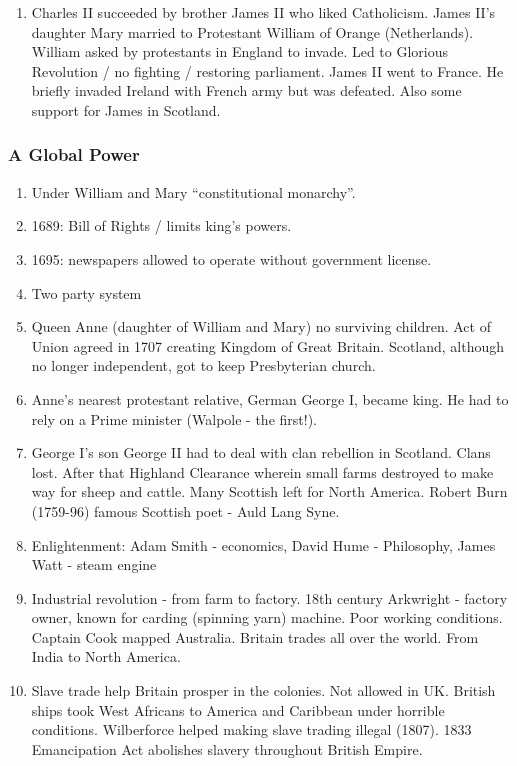 \documentclass[10pt,reqno]{amsart}
\begin{document}
\begin{enumerate}[i]
\item Charles II succeeded by brother James II who liked Catholicism.
James II's daughter Mary married to Protestant William of Orange (Netherlands). William asked by protestants in England to invade. Led to Glorious Revolution / no fighting / restoring parliament. James II went to France. He briefly invaded Ireland with French army but was defeated. Also some support for James in Scotland. 
\end{enumerate}


\subsubsection{A Global Power}

\begin{enumerate}[i]
\item Under William and Mary ``constitutional monarchy''. 
\item 1689: Bill of Rights / limits king's powers. 
\item 1695: newspapers allowed to operate without government license.
\item Two party system 
\item Queen Anne (daughter of William and Mary) no surviving children.
Act of Union agreed in 1707 creating Kingdom of Great Britain. Scotland, although no longer independent, got to keep Presbyterian church. 
\item Anne's nearest protestant relative, German George I, became king. He had to rely on a Prime minister (Walpole - the first!).
\item George I's son George II had to deal with clan rebellion in Scotland. Clans lost. After that Highland Clearance wherein small farms destroyed to make way for sheep and cattle. Many Scottish left for North America. 
Robert Burn (1759-96) famous Scottish poet - Auld Lang Syne. 
\item Enlightenment: 
Adam Smith - economics, David Hume - Philosophy, James Watt - steam engine 
\item Industrial revolution - from farm to factory. 18th century
Arkwright - factory owner, known for carding (spinning yarn) machine. 
Poor working conditions. 
Captain Cook mapped Australia. 
Britain trades all over the world. From India to North America. 
\item Slave trade help Britain prosper in the colonies. Not allowed in UK. British ships took West Africans to America and Caribbean under horrible conditions. Wilberforce helped making slave trading illegal (1807). 1833 Emancipation Act abolishes slavery throughout British Empire. 

\end{enumerate}
\end{document}
